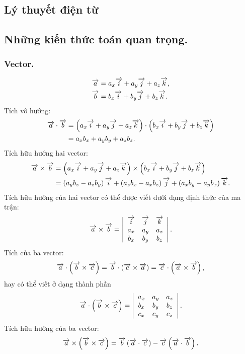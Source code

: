 \begin{appendices}
\chapter*{Lý thuyết điện từ}
\section{Những kiến thức toán quan trọng.}
\subsection{Vector.}
\begin{align*}
    \overrightarrow{a}&=a_x\overrightarrow{i}+a_y\overrightarrow{j}+a_z\overrightarrow{k},\\
    \overrightarrow{b}&=b_x\overrightarrow{i}+b_y\overrightarrow{j}+b_z\overrightarrow{k}.
\end{align*}
Tích vô hướng:
\begin{align*}
    \overrightarrow{a}\cdot\overrightarrow{b}&=\left(a_x\overrightarrow{i}+a_y\overrightarrow{j}+a_z\overrightarrow{k}\right)\cdot\left(b_x\overrightarrow{i}+b_y\overrightarrow{j}+b_z\overrightarrow{k}\right)\\
    &= a_xb_x+a_yb_y+a_zb_z.
\end{align*}
Tích hữu hướng hai vector:
\begin{align*}
    \overrightarrow{a}\times\overrightarrow{b}&=\left(a_x\overrightarrow{i}+a_y\overrightarrow{j}+a_z\overrightarrow{k}\right)\times\left(b_x\overrightarrow{i}+b_y\overrightarrow{j}+b_z\overrightarrow{k}\right)\\
    &=\left(a_yb_z-a_zb_y\right)\overrightarrow{i}+\left(a_zb_x-a_xb_z\right)\overrightarrow{j}+\left(a_xb_y-a_yb_x\right)\overrightarrow{k}.
\end{align*}
Tích hữu hướng của hai vector có thể được viết dưới dạng định thức của ma trận:
$$\overrightarrow{a}\times\overrightarrow{b}=\left|\begin{array}{ccc}
\overrightarrow{i} & \overrightarrow{j} & \overrightarrow{k}\\
a_x & a_y & a_z\\
b_x & b_y & b_z
\end{array}\right|.$$
Tích của ba vector:
$$\overrightarrow{a}\cdot\left(\overrightarrow{b}\times\overrightarrow{c}\right)=\overrightarrow{b}\cdot\left(\overrightarrow{c}\times\overrightarrow{a}\right)=\overrightarrow{c}\cdot\left(\overrightarrow{a}\times\overrightarrow{b}\right),$$
hay có thể viết ở dạng thành phần
$$\overrightarrow{a}\cdot\left(\overrightarrow{b}\times\overrightarrow{c}\right)=\left|\begin{array}{ccc}
a_x & a_y & a_z\\
b_x & b_y & b_z\\
c_x & c_y & c_z\\
\end{array}\right|.$$
Tích hữu hướng của ba vector:
$$\overrightarrow{a}\times\left(\overrightarrow{b}\times\overrightarrow{c}\right)=\overrightarrow{b}\left(\overrightarrow{a}\cdot\overrightarrow{c}\right)-\overrightarrow{c}\left(\overrightarrow{a}\cdot\overrightarrow{b}\right).$$

\end{appendices}
